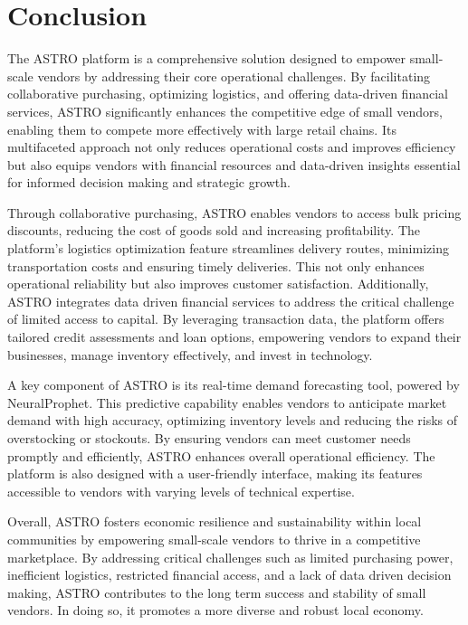 \chapter{Conclusion}
The ASTRO platform is a comprehensive solution designed to empower small-scale vendors by addressing their core operational challenges. By facilitating collaborative purchasing, optimizing logistics, and offering data-driven financial services, ASTRO significantly enhances the competitive edge of small vendors, enabling them to compete more effectively with large retail chains. Its multifaceted approach not only reduces operational costs and improves efficiency but also equips vendors with financial resources and data-driven insights essential for informed decision making and strategic growth.

Through collaborative purchasing, ASTRO enables vendors to access bulk pricing discounts, reducing the cost of goods sold and increasing profitability. The platform’s logistics optimization feature streamlines delivery routes, minimizing transportation costs and ensuring timely deliveries. This not only enhances operational reliability but also improves customer satisfaction. Additionally, ASTRO integrates data driven financial services to address the critical challenge of limited access to capital. By leveraging transaction data, the platform offers tailored credit assessments and loan options, empowering vendors to expand their businesses, manage inventory effectively, and invest in technology.

A key component of ASTRO is its real-time demand forecasting tool, powered by NeuralProphet. This predictive capability enables vendors to anticipate market demand with high accuracy, optimizing inventory levels and reducing the risks of overstocking or stockouts. By ensuring vendors can meet customer needs promptly and efficiently, ASTRO enhances overall operational efficiency. The platform is also designed with a user-friendly interface, making its features accessible to vendors with varying levels of technical expertise.

Overall, ASTRO fosters economic resilience and sustainability within local communities by empowering small-scale vendors to thrive in a competitive marketplace. By addressing critical challenges such as limited purchasing power, inefficient logistics, restricted financial access, and a lack of data driven decision making, ASTRO contributes to the long term success and stability of small vendors. In doing so, it promotes a more diverse and robust local economy.

